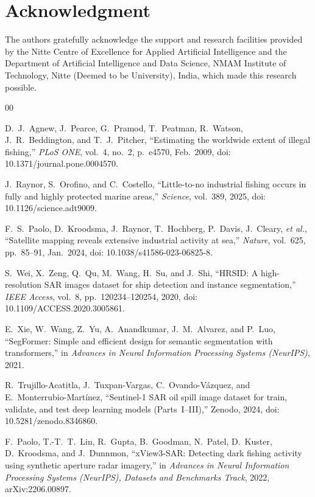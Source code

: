 \documentclass{ieeeaccess}
\begin{document}
\section*{Acknowledgment}
The authors gratefully acknowledge the support and research facilities provided by the Nitte Centre of Excellence for Applied Artificial Intelligence and the Department of Artificial Intelligence and Data Science, NMAM Institute of Technology, Nitte (Deemed to be University), India, which made this research possible.

\begin{thebibliography}{00}

D.~J.~Agnew, J.~Pearce, G.~Pramod, T.~Peatman, R.~Watson, J.~R.~Beddington, and T.~J.~Pitcher,
``Estimating the worldwide extent of illegal fishing,''
\textit{PLoS ONE}, vol.~4, no.~2, p.~e4570, Feb.~2009,
doi: 10.1371/journal.pone.0004570.

J.~Raynor, S.~Orofino, and C.~Costello,
``Little-to-no industrial fishing occurs in fully and highly protected marine areas,''
\textit{Science}, vol.~389, 2025,
doi: 10.1126/science.adt9009.

F.~S.~Paolo, D.~Kroodsma, J.~Raynor, T.~Hochberg, P.~Davis, J.~Cleary, \textit{et al.},
``Satellite mapping reveals extensive industrial activity at sea,''
\textit{Nature}, vol.~625, pp.~85--91, Jan.~2024,
doi: 10.1038/s41586-023-06825-8.

S.~Wei, X.~Zeng, Q.~Qu, M.~Wang, H.~Su, and J.~Shi,
``HRSID: A high-resolution SAR images dataset for ship detection and instance segmentation,''
\textit{IEEE Access}, vol.~8, pp.~120234--120254, 2020,
doi: 10.1109/ACCESS.2020.3005861.

E.~Xie, W.~Wang, Z.~Yu, A.~Anandkumar, J.~M.~Alvarez, and P.~Luo,
``SegFormer: Simple and efficient design for semantic segmentation with transformers,''
in \textit{Advances in Neural Information Processing Systems (NeurIPS)}, 2021.

R.~Trujillo-Acatitla, J.~Tuxpan-Vargas, C.~Ovando-V\'{a}zquez, and E.~Monterrubio-Mart\'{i}nez,
``Sentinel-1 SAR oil spill image dataset for train, validate, and test deep learning models (Parts~I--III),''
Zenodo, 2024,
doi: 10.5281/zenodo.8346860.

F.~Paolo, T.-T.~T.~Lin, R.~Gupta, B.~Goodman, N.~Patel, D.~Kuster, D.~Kroodsma, and J.~Dunnmon,
``xView3-SAR: Detecting dark fishing activity using synthetic aperture radar imagery,''
in \textit{Advances in Neural Information Processing Systems (NeurIPS), Datasets and Benchmarks Track}, 2022,
arXiv:2206.00897.


\end{thebibliography}
\end{document}
